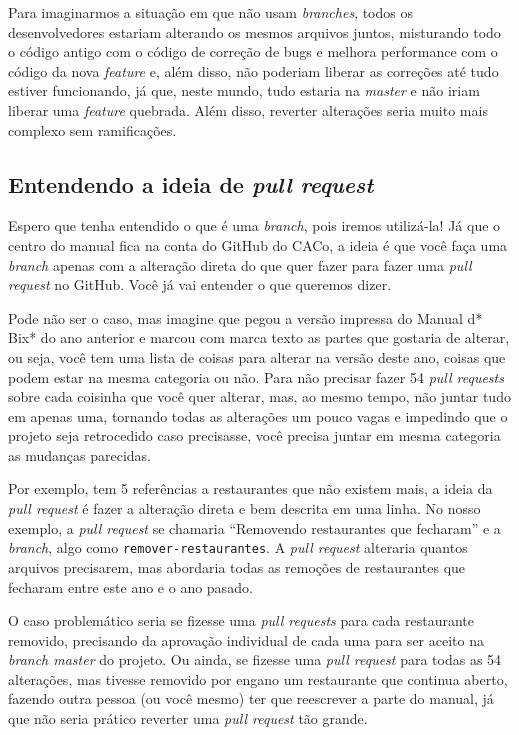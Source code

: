 \documentclass[a4paper,oneside,10pt]{memoir}
\begin{document}
Para imaginarmos a situação em que não usam \emph{branches}, todos os
desenvolvedores estariam alterando os mesmos arquivos juntos, misturando todo o
código antigo com o código de correção de bugs e melhora performance com o
código da nova \emph{feature} e, além disso, não poderiam liberar as correções
até tudo estiver funcionando, já que, neste mundo, tudo estaria na
\emph{master} e não iriam liberar uma \emph{feature} quebrada. Além disso,
reverter alterações seria muito mais complexo sem ramificações.

\subsection{Entendendo a ideia de \emph{pull request}}

Espero que tenha entendido o que é uma \emph{branch}, pois iremos utilizá-la!
Já que o centro do manual fica na conta do GitHub do CACo, a ideia é que você
faça uma \emph{branch} apenas com a alteração direta do que quer fazer para
fazer uma \emph{pull request} no GitHub. Você já vai entender o que queremos
dizer.

Pode não ser o caso, mas imagine que pegou a versão impressa do Manual d* Bix*
do ano anterior e marcou com marca texto as partes que gostaria de alterar, ou
seja, você tem uma lista de coisas para alterar na versão deste ano, coisas que
podem estar na mesma categoria ou não. Para não precisar fazer 54 \emph{pull
requests} sobre cada coisinha que você quer alterar, mas, ao mesmo tempo, não
juntar tudo em apenas uma, tornando todas as alterações um pouco vagas e
impedindo que o projeto seja retrocedido caso precisasse, você precisa juntar
em mesma categoria as mudanças parecidas.

Por exemplo, tem 5 referências a restaurantes que não existem mais, a ideia da
\emph{pull request} é fazer a alteração direta e bem descrita em uma linha. No
nosso exemplo, a \emph{pull request} se chamaria ``Removendo restaurantes que
fecharam'' e a \emph{branch}, algo como \texttt{remover-restaurantes}. A
\emph{pull request} alteraria quantos arquivos precisarem, mas abordaria todas
as remoções de restaurantes que fecharam entre este ano e o ano pasado.

O caso problemático seria se fizesse uma \emph{pull requests} para cada
restaurante removido, precisando da aprovação individual de cada uma para ser
aceito na \emph{branch master} do projeto. Ou ainda, se fizesse uma \emph{pull
request} para todas as 54 alterações, mas tivesse removido por engano um
restaurante que continua aberto, fazendo outra pessoa (ou você mesmo) ter que
reescrever a parte do manual, já que não seria prático reverter uma \emph{pull
request} tão grande.
\end{document}
